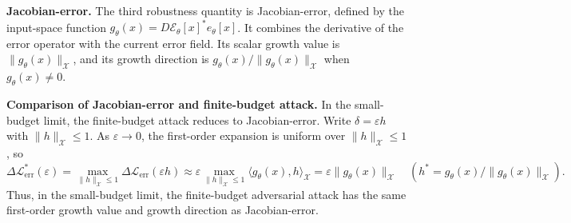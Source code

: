 \documentclass{article}
\begin{document}
\smallskip
\noindent\textbf{Jacobian-error.}
The third robustness quantity is Jacobian-error, defined by the
input-space function
$g_\theta(x)=D\mathcal{E}_\theta[x]^*e_\theta[x]$. It combines the derivative
of the error operator with the current error field. Its scalar growth value is
$\|g_\theta(x)\|_{\mathcal{X}}$, and its growth direction is
$g_\theta(x)/\|g_\theta(x)\|_{\mathcal{X}}$ when $g_\theta(x)\neq0$.

\smallskip
\noindent\textbf{Comparison of Jacobian-error and finite-budget attack.}
In the small-budget limit, the finite-budget attack reduces to
Jacobian-error. Write
$\delta=\varepsilon h$ with $\|h\|_{\mathcal{X}}\le 1$. As
$\varepsilon\to0$, the first-order expansion is uniform over
$\|h\|_{\mathcal{X}}\le1$, so
\begin{equation*}
\Delta\mathcal{L}_{\mathrm{err}}^*(\varepsilon)=\max_{\|h\|_{\mathcal{X}}\le1}\Delta\mathcal{L}_{\mathrm{err}}(\varepsilon h)\approx\varepsilon\max_{\|h\|_{\mathcal{X}}\le1}\langle g_\theta(x),h\rangle_{\mathcal{X}}=\varepsilon\|g_\theta(x)\|_{\mathcal{X}}\quad\left(h^*=g_\theta(x)/\|g_\theta(x)\|_{\mathcal{X}}\right).
\end{equation*}
Thus, in the small-budget limit, the finite-budget adversarial attack has the
same first-order growth value and growth direction as Jacobian-error.
\end{document}
